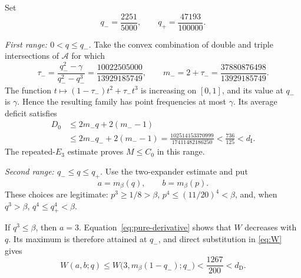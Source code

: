 \documentclass[11pt,a4paper]{amsart}
\newcommand{\cA}{\mathcal A}
\begin{document}
Set
\[
        q_-=\frac{2251}{5000},
        \qquad
        q_+=\frac{47193}{100000}.
\]

\medskip
\noindent\emph{First range: \(0<q\leqslant q_-\).}
Take the convex combination of double and triple intersections of \(\cA\)
for which
\[
 \tau_-=\frac{q_-^2-\gamma}{q_-^2-q_-^3}
       =\frac{10022505000}{13929185749},
 \qquad
 m_-=2+\tau_-=\frac{37880876498}{13929185749}.
\]
The function \(t\mapsto(1-\tau_-)t^2+\tau_-t^3\) is increasing on
\([0,1]\), and its value at \(q_-\) is \(\gamma\).  Hence the resulting
family has point frequencies at most \(\gamma\).  Its average deficit satisfies
\[
\begin{split}
 D_0
 &\leqslant 2m_-q+2(m_--1)\\
 &\leqslant 2m_-q_-+2(m_--1)
 =\frac{102514153370999}{17411482186250}
 <\frac{736}{125}<d_{\mathrm I}.
\end{split}
\]
The repeated-\(E_3\) estimate proves \(M\leqslant C_0\) in this range.

\medskip
\noindent\emph{Second range: \(q_-\leqslant q\leqslant q_+\).}
Use the two-expander estimate and put
\[
        a=m_\beta(q),\qquad b=m_\beta(p).
\]
These choices are legitimate: \(p^3\geqslant1/8>\beta\),
\(p^4\leqslant(11/20)^4<\beta\), and, when \(q^3>\beta\),
\(q^4\leqslant q_+^4<\beta\).

If \(q^3\leqslant\beta\), then \(a=3\).
Equation~\eqref{eq:pure-derivative} shows that \(W\) decreases with \(q\).
Its maximum is therefore attained at \(q_-\), and direct substitution in
\eqref{eq:W} gives
\begin{equation}\label{eq:middle-pure}
 W(a,b;q)
 \leqslant W\bigl(3,m_\beta(1-q_-);q_-\bigr)
 <\frac{1267}{200}<d_{\mathrm D}.
\end{equation}
\end{document}

